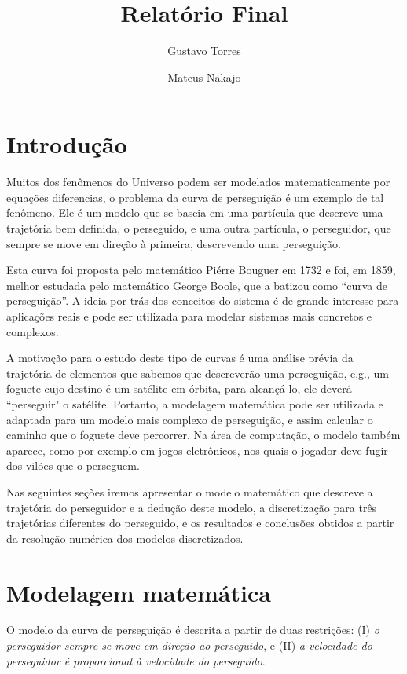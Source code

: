 \documentclass[a4paper,10pt]{article}
\title{Relatório Final}
\author{Gustavo Torres \and Mateus Nakajo}
\begin{document}
\lstset{language=Python}

\maketitle

\section{Introdução}
  \label{sec:intro}
  Muitos dos fenômenos do Universo podem ser modelados matematicamente por equações diferencias, o problema da curva de perseguição é um exemplo de tal fenômeno. Ele é um modelo que se baseia em uma partícula que descreve uma trajetória bem definida, o perseguido, e uma outra partícula, o perseguidor, que sempre se move em direção à primeira, descrevendo uma perseguição.
  
  Esta curva foi proposta pelo matemático Piérre Bouguer em 1732 e foi, em 1859, melhor estudada pelo matemático George Boole, que a batizou como “curva de perseguição”. 
  A ideia por trás dos conceitos do sistema é de grande interesse para  aplicações reais e pode ser utilizada para modelar sistemas mais concretos e complexos.
  
  A motivação para o estudo deste tipo de curvas é uma análise prévia da trajetória de elementos que sabemos que descreverão uma perseguição, e.g., um foguete cujo destino é um satélite em órbita, para alcançá-lo, ele deverá ``perseguir" o satélite. Portanto, a modelagem matemática pode ser utilizada e adaptada para um modelo mais complexo de perseguição, e assim calcular o caminho que o foguete deve percorrer. Na área de computação, o modelo também aparece, como por exemplo em jogos eletrônicos, nos quais o jogador deve fugir dos vilões que o perseguem. 
  
  Nas seguintes seções iremos apresentar o modelo matemático que descreve a trajetória do perseguidor e a dedução deste modelo, a discretização para três trajetórias diferentes do perseguido, e os resultados e conclusões obtidos a partir da resolução numérica dos modelos discretizados.
  
\section{Modelagem matemática}
  O modelo da curva de perseguição é descrita a partir de duas restrições\cite{lloyd}: (I) \emph{o perseguidor sempre se move em direção ao perseguido}, e (II) \emph{a velocidade do perseguidor é proporcional à velocidade do perseguido}.
  
\end{document}
